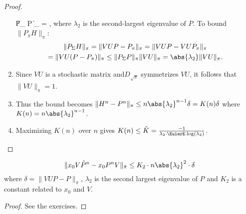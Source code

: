 \documentclass[12pt]{article}
\begin{document}
\begin{proof}
\begin{enumerate}
            \| P_{\Sigma} P \|_{\pi} =  \), where \(
            \lambda_2 \) is the second-largest eigenvalue of \( P \).
            To bound \( \| P_ {\pi} H \|_{\pi} \):
            \begin{multline*}
                \| P_{\Sigma} H \|_{\pi} = \| VUP - P_{\pi} \|_{\pi} =
                \| VUP - VUP_{\pi}\|_{\pi} \\
                = \| VU(P - P_{\pi})\|_{\pi} \le \|P_{\Sigma} P\|_{\pi}
                \|VU\|_{\pi} = \abs{\lambda_2} \|VU\|_{\pi}.
            \end{multline*}
        \item
            Since \( VU \) is a stochastic matrix and\( D_{\sqrt{\pi}} \)
            symmetrizes \( VU \), it follows that \( \| VU \|_{\pi} = 1 \).
        \item
            Thus the bound becomes \( \| H^n - P^n\|_{\pi} \le n \abs{\lambda_2}^
            {n-1} \delta = K(n) \delta \) where \( K(n) = n \abs{\lambda_2}^
            {n-1} \).
        \item
            Maximizing \( K(n) \) over \( n \) gives \( K(n) \le \hat{K}
            = \frac{-1}{\lambda_2 \cdot \EulerE \cdot \log(\lambda_2)} \).
    \end{enumerate}
\end{proof}

\begin{corollary}
    \[
        \| x_0 V \hat{P}^n - x_0 P^n V \|_{\hat{\pi}} \le K_2 \cdot n
        \abs{\lambda_2}^2 \cdot \delta
    \] where \( \delta = \| VUP - P \|_{\pi} \), \( \lambda_2 \) is the
    second largest eigenvalue of \( P \) and \( K_2 \) is a constant
    related to \( x_0 \) and \( V \).
\end{corollary}

\begin{proof}
    See the exercises.
\end{proof}
\end{document}
